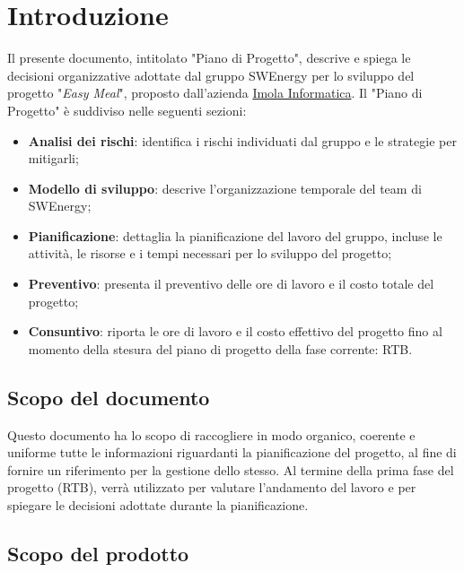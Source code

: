\section{Introduzione}

Il presente documento, intitolato "Piano di Progetto", descrive e spiega le
decisioni organizzative adottate dal gruppo SWEnergy per lo sviluppo del
progetto "\textit{Easy Meal}", proposto dall'azienda
\href{https://imolainformatica.it/}{Imola Informatica}. Il "Piano di Progetto" è
suddiviso nelle seguenti sezioni:

\begin{itemize}
	\item \textbf{Analisi dei rischi}: identifica i rischi individuati dal
	      gruppo e le strategie per mitigarli;

	\item \textbf{Modello di sviluppo}: descrive l'organizzazione temporale del
	      team di SWEnergy;

	\item \textbf{Pianificazione}: dettaglia la pianificazione del lavoro del
	      gruppo, incluse le attività, le risorse e i tempi necessari per lo
	      sviluppo del progetto;

	\item \textbf{Preventivo}: presenta il preventivo delle ore di lavoro e il
	      costo totale del progetto;

	\item \textbf{Consuntivo}: riporta le ore di lavoro e il costo effettivo del
	      progetto fino al momento della stesura del piano di progetto della
	      fase corrente: RTB.
\end{itemize}

\subsection{Scopo del documento}

Questo documento ha lo scopo di raccogliere in modo organico, coerente e
uniforme tutte le informazioni riguardanti la pianificazione del progetto, al
fine di fornire un riferimento per la gestione dello stesso. Al termine della
prima fase del progetto (RTB), verrà utilizzato per valutare l'andamento del
lavoro e per spiegare le decisioni adottate durante la pianificazione.

\subsection{Scopo del prodotto}

